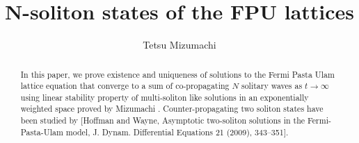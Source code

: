 \documentclass[11pt]{amsart}
\theoremstyle{remark}
\numberwithin{equation}{section}
\begin{document}
\title{N-soliton states of the FPU lattices}
\author{Tetsu Mizumachi}
\address{Faculty of Mathematics, Kyushu University,
Fukuoka 819-0395 Japan}
\begin{abstract}
In this paper, we prove existence and uniqueness of solutions to
the Fermi Pasta Ulam lattice equation that converge to a sum of 
co-propagating $N$ solitary waves as $t\to\infty$ using linear stability
property of multi-soliton like solutions in an exponentially weighted space
proved by Mizumachi \cite{Mi2}. Counter-propagating
two soliton states have been studied by [Hoffman and Wayne,
Asymptotic two-soliton solutions in the Fermi-Pasta-Ulam model,
J. Dynam. Differential Equations  21  (2009), 343--351].
\end{abstract}
\maketitle
\end{document}
